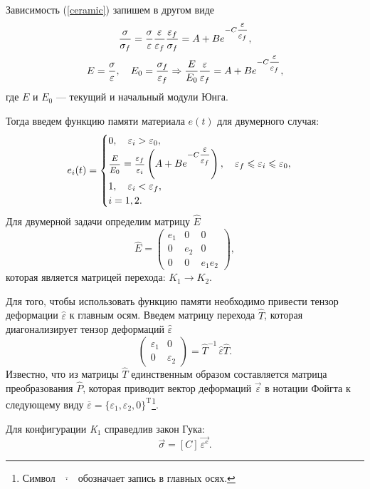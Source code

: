 \documentclass[12pt, a4paper]{article}
\begin{document}
Зависимость (\ref{ceramic}) запишем в другом виде
\[
\begin{gathered}
\frac{\sigma}{\sigma_f}=\frac{\sigma}{\varepsilon} \frac{\varepsilon}{\varepsilon_f}\frac{\varepsilon_f}{\sigma_f}=A+Be^{-C\hbox{\footnotesize$\displaystyle\frac{\varepsilon}{\varepsilon_f}$}},\\
E=\frac{\sigma}{\varepsilon},\quad E_0=\frac{\sigma_f}{\varepsilon_f} \Rightarrow \frac{E}{E_0}\frac{\varepsilon}{\varepsilon_f}=A+Be^{-C\hbox{\footnotesize$\displaystyle\frac{\varepsilon}{\varepsilon_f}$}},
\end{gathered}
\]
где $E$ и $E_0$ --- текущий и начальный модули Юнга.

Тогда введем функцию памяти материала $e(t)$ для двумерного случая:
\begin{equation}
	e_i(t) =
	\begin{cases}
		0,\quad \varepsilon_i>\varepsilon_0,\\
\hbox{\footnotesize$\displaystyle\frac{E}{E_0}$}=\hbox{\footnotesize$\displaystyle\frac{\varepsilon_f}{\varepsilon_i}$}\left(A+Be^{-C\hbox{\footnotesize$\displaystyle\frac{\varepsilon}{\varepsilon_f}$}}\right),\quad \varepsilon_f\leqslant\varepsilon_i\leqslant\varepsilon_0,\\
1,\quad \varepsilon_i<\varepsilon_f,\\
i=1,2.
	\end{cases}	
\end{equation}
Для двумерной задачи определим матрицу $\hat E$
\[
\hat{E}=
\begin{pmatrix}
	e_1&0&0\\
	0&e_2&0\\
	0&0&e_1e_2
\end{pmatrix},
\]
которая является матрицей перехода: $K_1 \rightarrow K_2$.

Для того, чтобы использовать функцию памяти необходимо привести тензор деформации $\hat\varepsilon$ к главным осям. Введем матрицу перехода $\hat T$, которая диагонализирует тензор деформаций $\hat \varepsilon$
\[
\begin{pmatrix}
\varepsilon_1&0\\
0&\varepsilon_2
\end{pmatrix}=
\hat{T}^{-1}\,\hat{\varepsilon} \hat T.
\]
Известно, что из матрицы $\hat T$ единственным образом составляется матрица преобразования $\hat P$, которая приводит вектор деформаций $\vec \varepsilon$ в нотации Фойгта к следующему виду $\overline{\varepsilon}=\{\varepsilon_1,\varepsilon_2,0\}^{\mathrm T}$\footnote{Символ $\,\overline{\,\,\cdotp\,\,}\,$ обозначает запись в главных осях.}.

 Для конфигурации \textit{K$_1$} справедлив закон Гука:
\[
\vec \sigma = [C]\,\vec{\varepsilon^e}.
\]
\end{document}
